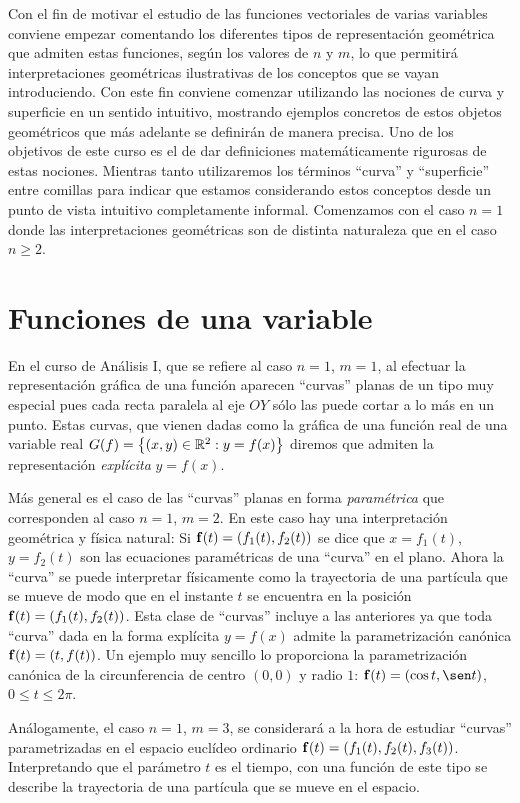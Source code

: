 Con el fin de motivar el estudio de las funciones vectoriales de varias variables conviene empezar comentando los diferentes tipos de representación geométrica que admiten estas funciones, según los valores de $n$ y $m$, lo que permitirá interpretaciones geométricas ilustrativas de los conceptos que se vayan introduciendo. Con este fin conviene comenzar utilizando las nociones de curva y superficie en un sentido intuitivo, mostrando ejemplos concretos de estos objetos geométricos que más adelante se definirán de manera precisa. Uno de los objetivos de este curso es el de dar definiciones matemáticamente rigurosas de estas nociones. Mientras tanto utilizaremos los términos ``curva'' y ``superficie'' entre comillas para indicar que estamos considerando estos conceptos desde un punto de vista intuitivo completamente informal. Comenzamos con el caso $n=1$ donde las interpretaciones geométricas son de distinta naturaleza que en el caso $n\geq 2$.

\section{Funciones de una variable}

En el curso de Análisis I, que se refiere al caso $n=1$, $m=1$, al efectuar la representación gráfica de una función aparecen ``curvas'' planas de un tipo muy especial pues cada recta paralela al eje $OY$ sólo las puede cortar a lo más en un punto. Estas curvas, que vienen dadas como la gráfica de una función real de una variable real $G(f)=\left\lbrace(x,y)\in\mathbb{R}^2 : y=f(x)\right\rbrace$ diremos que admiten la representación {\it explícita} $y=f(x)$.

Más general es el caso de las ``curvas'' planas en forma {\it paramétrica} que corresponden al caso $n=1$, $m=2$. En este caso hay una interpretación geométrica y física natural: Si $\mathbf{f}(t)=(f_1(t),f_2(t))$ se dice que $x=f_1(t)$, $y=f_2(t)$ son las ecuaciones paramétricas de una ``curva'' en  el plano. Ahora la ``curva'' se puede interpretar físicamente como la trayectoria de una partícula que se mueve de modo que en el instante $t$ se encuentra en la posición $\mathbf{f}(t)=(f_1(t),f_2(t))$. Esta clase de ``curvas'' incluye a las anteriores ya que toda ``curva'' dada en la forma explícita $y=f(x)$ admite la parametrización canónica $\mathbf{f}(t)=(t,f(t))$. Un ejemplo muy sencillo lo proporciona la parametrización canónica de la circunferencia de centro $(0,0)$ y radio $1$: $\f(t)=(\cos t, \sen t)$, $0\leq t\leq 2\pi$.

Análogamente, el caso $n=1$, $m=3$, se considerará a la hora de estudiar ``curvas'' parametrizadas en el espacio euclídeo ordinario $\mathbf{f}(t)=(f_1(t),f_2(t),f_3(t))$. Interpretando que el parámetro $t$ es el tiempo, con una función de este tipo se describe la trayectoria de una partícula que se mueve en el espacio.

